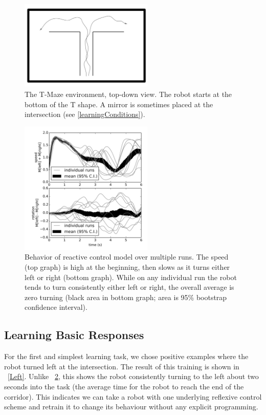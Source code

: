 \documentclass[conference]{IEEEtran}
\begin{document}
\begin{figure}[!t]
\centering
\includegraphics[width=2.5in]{tmazeRev.pdf}
\caption{The T-Maze environment, top-down view. The robot starts at the bottom of the T shape.
A mirror is sometimes placed at the intersection (see \ref{learningConditions}).}
\label{Tmaze}
\end{figure}


\begin{figure}[!t]
\centering
\includegraphics[width=2.5in]{basic/basic.png}
\caption{Behavior of reactive control model over multiple runs. The speed (top graph) is high at the beginning, then slows as it turns either left or right (bottom graph). While on any individual run the robot tends to turn consistently either left or right, the overall average is zero turning (black area in bottom graph; area is 95\% bootstrap confidence interval).}
\label{React}
\end{figure}

\subsection{Learning Basic Responses}

For the first and simplest learning task, we chose positive examples
where the robot turned left at the intersection.
The result of this training is shown in \figurename~\ref{Left}. Unlike 
\figurename~\ref{React}, this shows the robot consistently turning to the left about 
two seconds into the task (the average time for the robot to reach the end of the corridor).
This indicates we can take a robot with one underlying reflexive control scheme
and retrain it to change its behaviour without any explicit programming.
\end{document}
